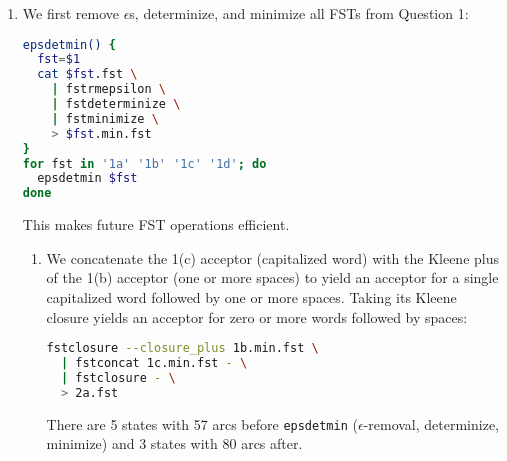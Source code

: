 \documentclass[a4paper,oneside,reqno]{amsart}
\begin{document}
\begin{enumerate}[label=\arabic*.]
\begin{enumerate}[label=(\alph*)]
      \item \texttt{word\_fst} accepts a string of zero or more letters in $L$
        excluding <space> and <eps>. It is formed by taking the 1(a) acceptor
        (any single letter in $L$), differencing it with the 1(b) acceptor
        (single <space>), and taking the closure:
        \begin{lstlisting}[language=bash]
word_fst=$(fstdifference 1a.fst 1b.fst \
  | fstclosure)
        \end{lstlisting}

        \texttt{a\_fst} accepts the single character ``a'':
        \begin{lstlisting}[language=bash]
a_fst=$(echo '0 1 a a\n1' \
  | fstcompile --isymbols=$SYMBOLS --osymbols=$SYMBOLS -)
        \end{lstlisting}

        Concatenating $\texttt{word\_fst} \circ \texttt{a\_fst} \circ \texttt{word\_fst}$
        yields an FST accepting a word containing the letter ``a''
        \begin{lstlisting}[language=bash]
fstconcat <(echo $a_fst) <(echo $word_fst) \
  | fstconcat <(echo $word_fst) - \
  > 1d.fst
        \end{lstlisting}

    \end{enumerate}

  \item We first remove $\epsilon$s, determinize, and minimize all FSTs from Question 1:
    \begin{lstlisting}[language=bash]
epsdetmin() {
  fst=$1
  cat $fst.fst \
    | fstrmepsilon \
    | fstdeterminize \
    | fstminimize \
    > $fst.min.fst
}
for fst in '1a' '1b' '1c' '1d'; do
  epsdetmin $fst
done
    \end{lstlisting}
    This makes future FST operations efficient.

    \begin{enumerate}[label=(\alph*)]
      \item
        We concatenate the 1(c) acceptor (capitalized word) with
        the Kleene plus of the 1(b) acceptor (one or more spaces)
        to yield an acceptor for a single capitalized word followed
        by one or more spaces. Taking its Kleene closure yields an
        acceptor for zero or more words followed by spaces:
        \begin{lstlisting}[language=bash]
fstclosure --closure_plus 1b.min.fst \
  | fstconcat 1c.min.fst - \
  | fstclosure - \
  > 2a.fst
        \end{lstlisting}
        There are 5 states with 57 arcs before \texttt{epsdetmin} ($\epsilon$-removal,
        determinize, minimize) and 3 states with 80 arcs after.


\end{enumerate}
\end{enumerate}
\end{document}
